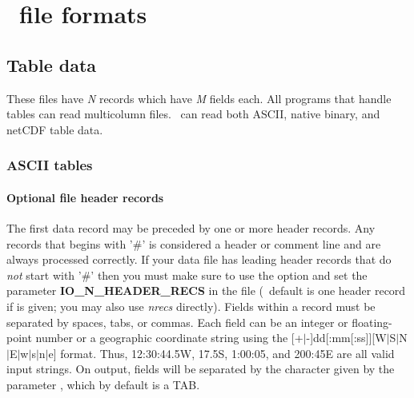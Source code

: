 %
%

\chapter{\gmt\ file formats}
\label{app:B}

\section{Table data}

These files have \emph{N} records which have \emph{M} fields each.
All programs that handle tables can read multicolumn files.  \GMT\ can
read both ASCII, native binary, and netCDF table data.

\subsection{ASCII tables}

\subsubsection{Optional file header records}
The first data record may be preceded by one or more header records.
Any records that begins with '\#' is considered a header or comment
line and are always processed correctly.  If your data file has leading
header records that do \emph{not} start with '\#' then you must
make sure to use the  option and set
the parameter \textbf{IO\_N\_HEADER\_RECS} in the  file
(\GMT\ default is one header record if  is given; you may also
use \emph{nrecs} directly).  Fields
within a record must be separated by spaces, tabs, or commas.
Each field can be an integer or floating-point number or a geographic
coordinate string using the [+$|$-]dd[:mm[:ss]][W$|$S$|$N$|$E$|$w$|$s$|$n$|$e] format.
Thus, 12:30:44.5W, 17.5S, 1:00:05, and 200:45E are all valid input strings.
On output, fields will be separated by the character given by the parameter ,
which by default is a TAB.

